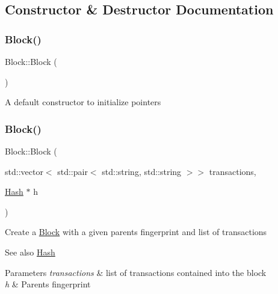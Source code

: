 \subsection{Constructor \& Destructor Documentation}
\mbox{\label{classBlock_a37658a946bf5067ad01d68d9ff086adc}} 
\subsubsection{\texorpdfstring{Block()}{Block()}\hspace{0.1cm}{\footnotesize\ttfamily [1/2]}}
{\footnotesize\ttfamily Block\+::\+Block (\begin{DoxyParamCaption}{ }\end{DoxyParamCaption})}

A default constructor to initialize pointers \mbox{\label{classBlock_a9ce633d8b027591b12f7c3ec7a2dcad2}} 
\subsubsection{\texorpdfstring{Block()}{Block()}\hspace{0.1cm}{\footnotesize\ttfamily [2/2]}}
{\footnotesize\ttfamily Block\+::\+Block (\begin{DoxyParamCaption}\item[{std\+::vector$<$ std\+::pair$<$ std\+::string, std\+::string $>$$>$}]{transactions,  }\item[{\mbox{\hyperlink{classHash}{Hash}} $\ast$}]{h }\end{DoxyParamCaption})\hspace{0.3cm}{\ttfamily [explicit]}}

Create a \mbox{\hyperlink{classBlock}{Block}} with a given parent\textquotesingle{}s fingerprint and list of transactions \begin{DoxySeeAlso}{See also}
\mbox{\hyperlink{classHash}{Hash}}
\end{DoxySeeAlso}

\begin{DoxyParams}{Parameters}
{\em transactions} & list of transactions contained into the block \\
\hline
{\em h} & Parent\textquotesingle{}s fingerprint \\
\hline
\end{DoxyParams}
\mbox{\label{classBlock_a8e35c9089e806962b83bca4e5e288142}} 
